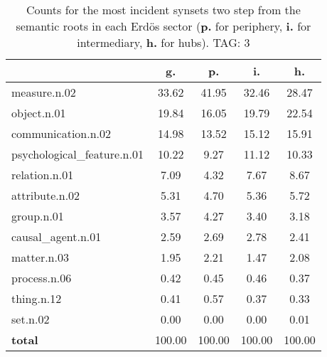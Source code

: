 \begin{table}[h!]
\begin{center}
\begin{tabular}{| l || c | c | c | c |}\hline
 & {\bf g.} & {\bf p.} & {\bf i.} & {\bf h.} \\\hline\hline
measure.n.02 & 33.62  & 41.95  & 32.46  & 28.47 \\\hline
object.n.01 & 19.84  & 16.05  & 19.79  & 22.54 \\\hline
communication.n.02 & 14.98  & 13.52  & 15.12  & 15.91 \\\hline
psychological\_feature.n.01 & 10.22  & 9.27  & 11.12  & 10.33 \\\hline
relation.n.01 & 7.09  & 4.32  & 7.67  & 8.67 \\\hline
attribute.n.02 & 5.31  & 4.70  & 5.36  & 5.72 \\\hline
group.n.01 & 3.57  & 4.27  & 3.40  & 3.18 \\\hline
causal\_agent.n.01 & 2.59  & 2.69  & 2.78  & 2.41 \\\hline
matter.n.03 & 1.95  & 2.21  & 1.47  & 2.08 \\\hline
process.n.06 & 0.42  & 0.45  & 0.46  & 0.37 \\\hline
thing.n.12 & 0.41  & 0.57  & 0.37  & 0.33 \\\hline
set.n.02 & 0.00  & 0.00  & 0.00  & 0.01 \\\hline\hline
{{\bf total}} & 100.00  & 100.00  & 100.00  & 100.00 \\\hline
\end{tabular}
\caption{Counts for the most incident synsets two step from the semantic roots in each Erd\"os sector ({\bf p.} for periphery, {\bf i.} for intermediary, {\bf h.} for hubs). TAG: 3}
\end{center}
\end{table}